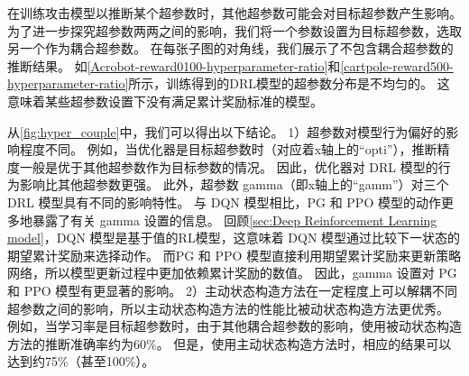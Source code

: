 在训练攻击模型以推断某个超参数时，其他超参数可能会对目标超参数产生影响。
为了进一步探究超参数两两之间的影响，我们将一个参数设置为目标超参数，选取另一个作为耦合超参数。
在每张子图的对角线，我们展示了不包含耦合超参数的推断结果。
如\autoref{Acrobot-reward0100-hyperparameter-ratio}和\autoref{cartpole-reward500-hyperparameter-ratio}所示，训练得到的DRL模型的超参数分布是不均匀的。
这意味着某些超参数设置下没有满足累计奖励标准的模型。

从\autoref{fig:hyper_couple}中，我们可以得出以下结论。
1）超参数对模型行为偏好的影响程度不同。
例如，当优化器是目标超参数时（对应着x轴上的“opti”），推断精度一般是优于其他超参数作为目标参数的情况。
因此，优化器对 DRL 模型的行为影响比其他超参数更强。
此外，超参数 gamma（即x轴上的“gamm”）对三个 DRL 模型具有不同的影响特性。
与 DQN 模型相比，PG 和 PPO 模型的动作更多地暴露了有关 gamma 设置的信息。
回顾\autoref{sec:Deep Reinforcement Learning model}，DQN 模型是基于值的RL模型，这意味着 DQN 模型通过比较下一状态的期望累计奖励来选择动作。
而PG 和 PPO 模型直接利用期望累计奖励来更新策略网络，所以模型更新过程中更加依赖累计奖励的数值。
因此，gamma 设置对 PG 和 PPO 模型有更显著的影响。 
2）主动状态构造方法在一定程度上可以解耦不同超参数之间的影响，所以主动状态构造方法的性能比被动状态构造方法更优秀。
例如，当学习率是目标超参数时，由于其他耦合超参数的影响，使用被动状态构造方法的推断准确率约为60\%。
但是，使用主动状态构造方法时，相应的结果可以达到约75\%（甚至100\%）。






